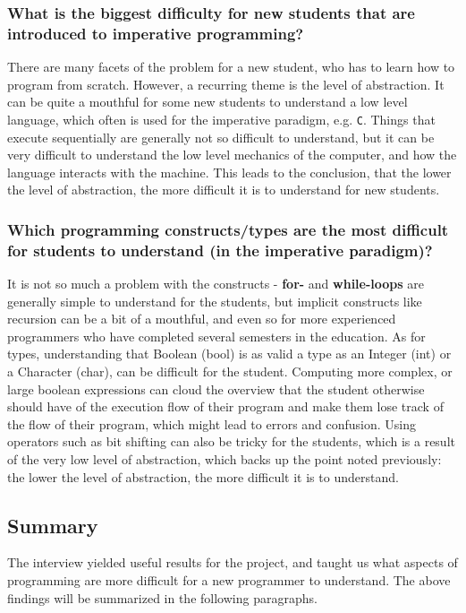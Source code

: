 \subsubsection{What is the biggest difficulty for new students that are introduced to imperative programming?}

There are many facets of the problem for a new student, who has to learn how to program from scratch.
However, a recurring theme is the level of abstraction.
It can be quite a mouthful for some new students to understand a low level language, which often is used for the imperative paradigm, e.g. \texttt{C}.
Things that execute sequentially are generally not so difficult to understand, but it can be very difficult to understand the low level 
mechanics of the computer, and how the language interacts with the machine.
This leads to the conclusion, that the lower the level of abstraction, the more difficult it is to understand for new students.

\subsubsection{Which programming constructs/types are the most difficult for students to understand (in the imperative paradigm)?}

It is not so much a problem with the constructs - \textbf{for-} and \textbf{while-loops} are generally simple to understand for the students, but implicit constructs like recursion can be a bit of a mouthful, and even so for more experienced programmers who have completed several semesters in the education.
As for types, understanding that Boolean (bool) is as valid a type as an Integer (int) or a Character (char), can be difficult for the student.
Computing more complex, or large boolean expressions can cloud the overview that the student otherwise should have of the execution flow of their program and make them lose track of the flow of their program, which might lead to errors and confusion.
Using operators such as bit shifting can also be tricky for the students, which is a result of the very low level of abstraction, which backs up the point noted previously: the lower the level of abstraction, the more difficult it is to understand.

\subsection{Summary}

The interview yielded useful results for the project, and taught us what aspects of programming are more difficult for a new programmer to understand.
The above findings will be summarized in the following paragraphs.

